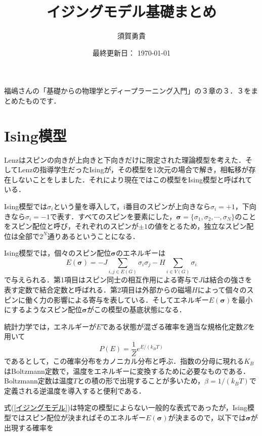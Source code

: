 \documentclass[a4paper,11pt]{jsarticle}
\begin{document}
\title{イジングモデル基礎まとめ}
\author{須賀勇貴}
\date{最終更新日： \today}
\maketitle

福嶋さんの「基礎からの物理学とディープラーニング入門」の３章の３．３をまとめたものです．\cite{Witten:1998qj}\par

\section*{Ising模型}
Lenzはスピンの向きが上向きと下向きだけに限定された理論模型を考えた．そしてLenzの指導学生だったIsingが，その模型を1次元の場合で解き，相転移が存在しないことをしました．それにより現在ではこの模型をIsing模型と呼ばれている．\par
Ising模型では$\sigma_i$という量を導入して，i番目のスピンが上向きなら$\sigma_i = +1$，下向きなら$\sigma_i = -1$で表す．すべてのスピンを要素にした，$\bm{\sigma}=\{ \sigma_1, \sigma_2, \cdots, \sigma_N \}$のことをスピン配位と呼び，それぞれのスピンが$\pm 1$の値をとるため，独立なスピン配位は全部で$2^N$通りあるということになる．\par
Ising模型では，個々のスピン配位$\bm{\sigma}$のエネルギーは
\begin{equation}
  E(\bm{\sigma}) = -J\sum_{i,j \in E(G)}\sigma_i \sigma_j -H \sum_{i \in V(G)} \sigma_i
\end{equation}
で与えられる．第1項目はスピン同士の相互作用による寄与で$J$は結合の強さを表す定数で結合定数と呼ばれる．第2項目は外部からの磁場$H$によって個々のスピンに働く力の影響による寄与を表している．そしてエネルギー$E(\bm{\sigma})$を最小にするようなスピン配位$\bm{\sigma}$がこの模型の基底状態になる．\par
統計力学では，エネルギーが$E$である状態が混ざる確率を適当な規格化定数$Z$を用いて
\begin{equation}
  P(E) = \frac{1}{Z}e^{E/(k_B T)} \label{イジングモデル}
\end{equation}
であるとして，この確率分布をカノニカル分布と呼ぶ．指数の分母に現れる$K_B$はBoltzmann定数で，温度をエネルギーに変換するために必要なものである．Boltzmann定数は温度$T$との積の形で出現することが多いため，$\beta = 1/(k_B T)$で定義される逆温度を導入すると便利である．\par
式(\ref{イジングモデル})は特定の模型によらない一般的な表式であったが，Ising模型ではスピン配位が決まればそのエネルギー$E(\bm{\sigma})$が決まるので，以下では$\bm{\sigma}$が出現する確率を
\end{document}

